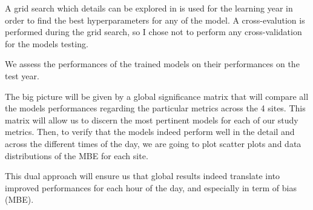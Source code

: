 A grid search which details can be explored in \cite{myrepo} is used for the learning year in order to find the best hyperparameters for any of the model.
A cross-evalution is performed during the grid search, so I chose not to perform any cross-validation for the models testing.

We assess the performances of the trained models on their performances on the test year.

The big picture will be given by a global significance matrix that will compare all the models performances regarding the particular metrics across the 4 sites.
This matrix will allow us to discern the most pertinent models for each of our study metrics.
Then, to verify that the models indeed perform well in the detail and across the different times of the day, we are going to plot scatter plots and data distributions of the MBE for each site.

This dual approach will ensure us that global results indeed translate into improved performances for each hour of the day, and especially in term of bias (MBE).